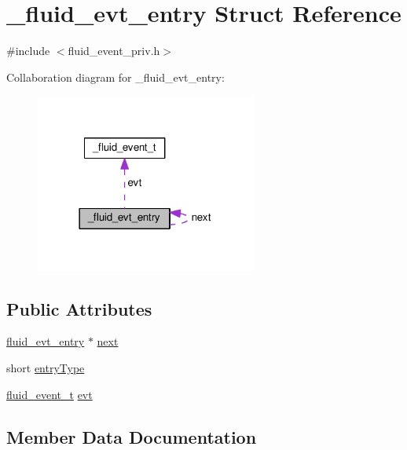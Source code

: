 \hypertarget{struct__fluid__evt__entry}{}\section{\+\_\+fluid\+\_\+evt\+\_\+entry Struct Reference}
\label{struct__fluid__evt__entry}


{\ttfamily \#include $<$fluid\+\_\+event\+\_\+priv.\+h$>$}



Collaboration diagram for \+\_\+fluid\+\_\+evt\+\_\+entry\+:
\nopagebreak
\begin{figure}[H]
\begin{center}
\leavevmode
\includegraphics[width=206pt]{struct__fluid__evt__entry__coll__graph}
\end{center}
\end{figure}
\subsection*{Public Attributes}
\begin{DoxyCompactItemize}
\item 
\hyperlink{fluid__event__priv_8h_ae1b4d1ef2ce32890f8cb36837628a9d8}{fluid\+\_\+evt\+\_\+entry} $\ast$ \hyperlink{struct__fluid__evt__entry_a943689018328859e48f75f1d9ae9d48f}{next}
\item 
short \hyperlink{struct__fluid__evt__entry_ad63b5e75af079b7e62337710031482e3}{entry\+Type}
\item 
\hyperlink{types_8h_aca09348be1b6e6ee7fce49dd4734f1ba}{fluid\+\_\+event\+\_\+t} \hyperlink{struct__fluid__evt__entry_ab73d983a1a210d0c1212d94f0c31ada1}{evt}
\end{DoxyCompactItemize}


\subsection{Member Data Documentation}
\mbox{\label{struct__fluid__evt__entry_ad63b5e75af079b7e62337710031482e3}} 
